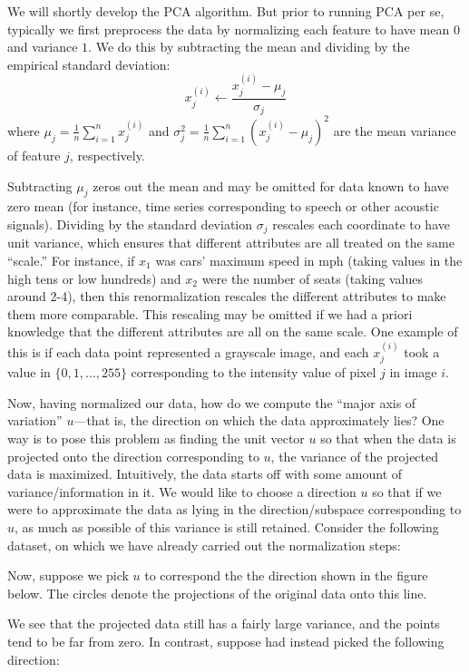 We will shortly develop the PCA algorithm. But prior to running PCA
per se, typically we first preprocess the data by normalizing each feature
to have mean $0$ and variance $1$. We do this by subtracting the mean and
dividing by the empirical standard deviation:
\[
    x^{(i)}_j \leftarrow \frac{x^{(i)}_j - \mu_j}{\sigma_j}
\]
where $\mu_j = \frac{1}{n} \sum^n_{i=1} x^{(i)}_j$
and $\sigma^2_j = \frac{1}{n} \sum_{i=1}^n (x^{(i)}_j - \mu_j)^2$ are the mean variance of
feature $j$, respectively.

Subtracting $\mu_j$ zeros out the mean and may be omitted for data known
to have zero mean (for instance, time series corresponding to speech or other
acoustic signals). Dividing by the standard deviation $\sigma_j$ rescales each coordinate to have unit variance, which ensures that different attributes are all
treated on the same ``scale.'' For instance, if $x_1$ was cars' maximum speed in
mph (taking values in the high tens or low hundreds) and $x_2$ were the number of seats (taking values around 2-4), then this renormalization rescales
the different attributes to make them more comparable. This rescaling may
be omitted if we had a priori knowledge that the different attributes are all
on the same scale. One example of this is if each data point represented a
grayscale image, and each $x^{(i)}_j$
took a value in $\{0, 1, \ldots, 255\}$ corresponding
to the intensity value of pixel $j$ in image $i$.

Now, having normalized our data, how do we compute the ``major axis
of variation'' $u$---that is, the direction on which the data approximately lies?
One way is to pose this problem as finding the unit vector $u$ so that when
the data is projected onto the direction corresponding to $u$, the variance of
the projected data is maximized. Intuitively, the data starts off with some
amount of variance/information in it. We would like to choose a direction $u$
so that if we were to approximate the data as lying in the direction/subspace
corresponding to $u$, as much as possible of this variance is still retained.
Consider the following dataset, on which we have already carried out the
normalization steps:


Now, suppose we pick $u$ to correspond the the direction shown in the
figure below. The circles denote the projections of the original data onto this
line.


We see that the projected data still has a fairly large variance, and the
points tend to be far from zero. In contrast, suppose had instead picked the
following direction:

